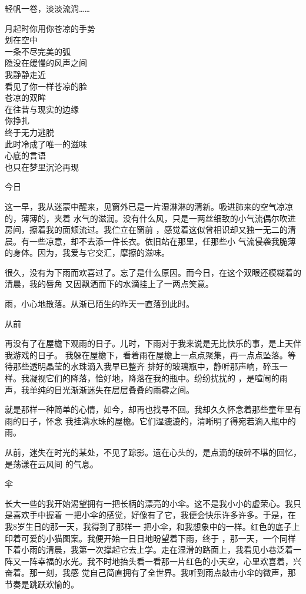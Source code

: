 \documentclass[12pt,a4paper]{article}
\newcommand{\subpart}[1]{
	\begingroup \par
	\vspace{1ex} \centering #1
	\par \endgroup
}
\begin{document}
		轻帆一卷，淡淡流淌……

	\endwriting



		\longpoem{}{}{}
		月起时你用你苍凉的手势 \\
		划在空中 \\
		一条不尽完美的弧 \\
		隐没在缓慢的风声之间 \\
		我静静走近 \\
		看见了你一样苍凉的脸 \\
		苍凉的双眸 \\
		在往昔与现实的边缘 \\
		你挣扎 \\
		终于无力逃脱 \\
		此时冷成了唯一的滋味 \\
		心底的言语 \\
		也只在梦里沉沦再现
		\endlongpoem
	\endwriting



		\subpart{今日}
		这一早，我从迷蒙中醒来，见窗外已是一片湿淋淋的清新。吸进肺来的空气凉凉的，薄薄的，夹着
	水气的滋润。没有什么风，只是一两丝细致的小气流偶尔吹进房间，擦着我的面颊流过。我伫立在窗前
	，感觉着这似曾相识却又独一无二的清晨。有一些凉意，却不去添一件长衣。依旧站在那里，任那些小
	气流侵袭我脆薄的身体。因为，我爱与它交汇，摩擦的滋味。

		很久，没有为下雨而欢喜过了。忘了是什么原因。而今日，在这个双眼还模糊着的清晨，我的唇角
	又因飘洒而下的水滴挂上了一两点笑意。

		雨，小心地散落。从渐已陌生的昨天一直落到此时。

		\subpart{从前}
		再没有了在屋檐下观雨的日子。儿时，下雨对于我来说是无比快乐的事，是上天伴我游戏的日子。
	我躲在屋檐下，看着雨在屋檐上一点点聚集，再一点点坠落。等待那些透明晶莹的水珠滴入我早已整齐
	排好的玻璃瓶中，静听那声响，碎玉一样。我凝视它们的降落，恰好地，降落在我的瓶中。纷纷扰扰的
	，是喧闹的雨声，我单纯的目光渐渐迷失在层层叠叠的雨雾之间。

		就是那样一种简单的心情，如今，却再也找寻不回。我却久久怀念着那些童年里有雨的日子，怀念
	我挂满水珠的屋檐。它们湿漉漉的，清晰明了得宛若滴入瓶中的雨。

		从前，迷失在时光的某处，不见了踪影。遗在心头的，是点滴的破碎不堪的回忆，是荡漾在云风间
	的气息。

		\subpart{伞}
		长大一些的我开始渴望拥有一把长柄的漂亮的小伞。这不是我小小的虚荣心。我只是喜欢手中握着
	一把小伞的感觉，好像有了它，我便会快乐许多许多。于是，在我8岁生日的那一天，我得到了那样一
	把小伞，和我想象中的一样。红色的底子上印着可爱的小猫图案。我便开始一日日地盼望着下雨，终于
	，那一天，一个同样下着小雨的清晨，我第一次撑起它去上学。走在湿滑的路面上，我看见小巷泛着一
	阵又一阵幸福的水光。我不时地抬头看一看那一片红色的小天空，心里欢喜着，兴奋着。那一刻，我感
	觉自己简直拥有了全世界。我听到雨点敲击小伞的微声，那节奏是跳跃欢愉的。
\end{document}
